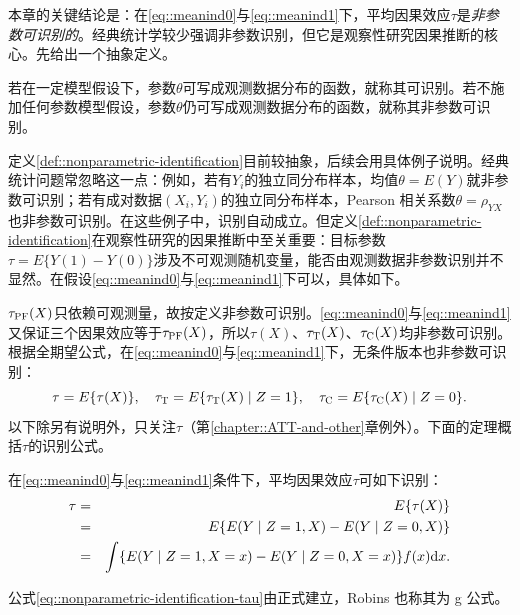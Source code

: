 本章的关键结论是：在\eqref{eq::meanind0}与\eqref{eq::meanind1}下，平均因果效应$\tau$是{\it 非参数可识别的}。经典统计学较少强调非参数识别，但它是观察性研究因果推断的核心。先给出一个抽象定义。 

\begin{definition}[识别性]
\label{def::nonparametric-identification}
若在一定模型假设下，参数$\theta$可写成观测数据分布的函数，就称其可识别。若不施加任何参数模型假设，参数$\theta$仍可写成观测数据分布的函数，就称其非参数可识别。 
\end{definition}



定义\ref{def::nonparametric-identification}目前较抽象，后续会用具体例子说明。经典统计问题常忽略这一点：例如，若有$Y_i$的独立同分布样本，均值$\theta = E(Y)$就非参数可识别；若有成对数据$(X_i, Y_i)$的独立同分布样本，Pearson 相关系数$\theta = \rho_{YX}$也非参数可识别。在这些例子中，识别自动成立。但定义\ref{def::nonparametric-identification}在观察性研究的因果推断中至关重要：目标参数$\tau = E\{ Y(1)  - Y(0)\}$涉及不可观测随机变量，能否由观测数据非参数识别并不显然。在假设\eqref{eq::meanind0}与\eqref{eq::meanind1}下可以，具体如下。 


 $   \tau_\textsc{PF}(X)$只依赖可观测量，故按定义非参数可识别。\eqref{eq::meanind0}与\eqref{eq::meanind1}又保证三个因果效应等于$   \tau_\textsc{PF}(X)$，所以$\tau(X) $、$\tau_\textsc{T}(X) $、$  \tau_\textsc{C}(X)$均非参数可识别。根据全期望公式，在\eqref{eq::meanind0}与\eqref{eq::meanind1}下，无条件版本也非参数可识别：
$$
 \tau = E\{ \tau(X)\},\quad
 \tau_\textsc{T} = E\{  \tau_\textsc{T}(X) \mid Z=1  \}, \quad
   \tau_\textsc{C} = E\{   \tau_\textsc{C}(X) \mid Z=0 \}.
 $$
以下除另有说明外，只关注$\tau$（第\ref{chapter::ATT-and-other}章例外）。下面的定理概括$\tau$的识别公式。 
 
\begin{theorem}
\label{thm::identification-formula}
在\eqref{eq::meanind0}与\eqref{eq::meanind1}条件下，平均因果效应$\tau$可如下识别：
 \begin{eqnarray} 
 \tau &=& E\{ \tau(X)\} \\
 &=& E\{  E(Y\mid Z=1, X) - E(Y\mid Z=0, X) \} \label{eq::nonparametric-identification-tau} \\
 &=&  \int \{  E(Y\mid Z=1, X=x) - E(Y\mid Z=0, X=x)\} f(x) \textup{d} x.
 \end{eqnarray}
\end{theorem} 
 
 
 公式\eqref{eq::nonparametric-identification-tau}由\citet{rosenbaum1983central}正式建立，Robins 也称其为 g 公式\citep[see][]{hernan2020causal}。
 
